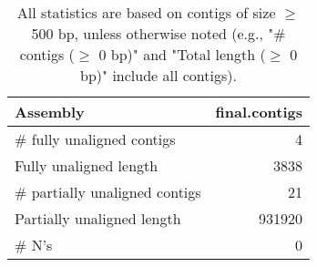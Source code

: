 \documentclass[12pt,a4paper]{article}
\begin{document}
\begin{table}[ht]
\begin{center}
\caption{All statistics are based on contigs of size $\geq$ 500 bp, unless otherwise noted (e.g., "\# contigs ($\geq$ 0 bp)" and "Total length ($\geq$ 0 bp)" include all contigs).}
\begin{tabular}{|l*{1}{|r}|}
\hline
Assembly & final.contigs \\ \hline
\# fully unaligned contigs & 4 \\ \hline
Fully unaligned length & 3838 \\ \hline
\# partially unaligned contigs & 21 \\ \hline
Partially unaligned length & 931920 \\ \hline
\# N's & 0 \\ \hline
\end{tabular}
\end{center}
\end{table}
\end{document}
